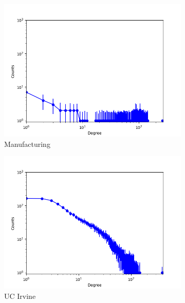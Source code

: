 \begin{figure}[h]
\begin{subfigure}[b]{0.300\textwidth}
            \includegraphics[width=\textwidth]{img/corpus/ilfm_manufacturing_0}
            \caption {{\small Manufacturing}}    
        \end{subfigure}
        \begin{subfigure}[b]{0.300\textwidth}
            \centering
            \includegraphics[width=\textwidth]{img/corpus/ilfm_ucirvine_0}
            \caption {{\small UC Irvine}}    
            \label{fig:mean and std of net14}
        \end{subfigure}
        \begin{subfigure}[b]{0.300\textwidth}
            \centering

\end{subfigure}
\end{figure}
